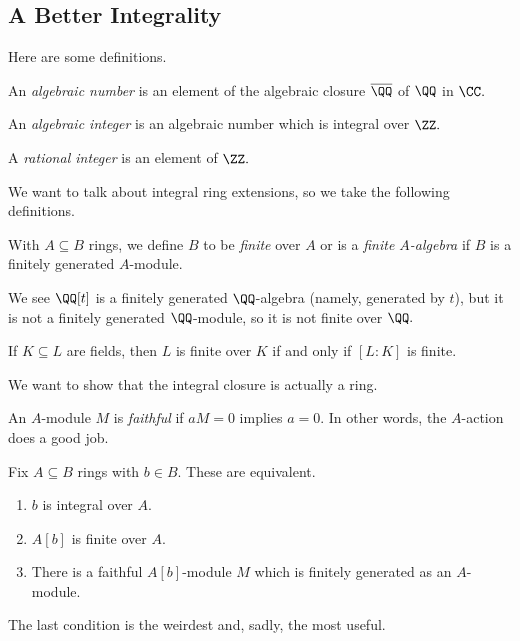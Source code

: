 \subsection{A Better Integrality}
Here are some definitions.
\begin{defi}
    An \textit{algebraic number} is an element of the algebraic closure $\overline\QQ$ of $\QQ$ in $\CC.$
\end{defi}
\begin{defi}
    An \textit{algebraic integer} is an algebraic number which is integral over $\ZZ.$
\end{defi}
\begin{defi}
    A \textit{rational integer} is an element of $\ZZ.$
\end{defi}
We want to talk about integral ring extensions, so we take the following definitions.
\begin{defi}[Finite]
    With $A\subseteq B$ rings, we define $B$ to be \textit{finite} over $A$ or is a \textit{finite $A$-algebra} if $B$ is a finitely generated $A$-module.
\end{defi}
\begin{ex}
    We see $\QQ[t]$ is a finitely generated $\QQ$-algebra (namely, generated by $t$), but it is not a finitely generated $\QQ$-module, so it is not finite over $\QQ.$
\end{ex}
\begin{ex}
    If $K\subseteq L$ are fields, then $L$ is finite over $K$ if and only if $[L:K]$ is finite.
\end{ex}
We want to show that the integral closure is actually a ring.
\begin{defi}[Faithful]
    An $A$-module $M$ is \textit{faithful} if $aM=0$ implies $a=0.$ In other words, the $A$-action does a good job.
\end{defi}
\begin{prop}
    Fix $A\subseteq B$ rings with $b\in B.$ These are equivalent.
    \begin{enumerate}[label=(\alph*)]
        \item $b$ is integral over $A.$
        \item $A[b]$ is finite over $A.$
        \item There is a faithful $A[b]$-module $M$ which is finitely generated as an $A$-module.
    \end{enumerate}
\end{prop}
The last condition is the weirdest and, sadly, the most useful.
